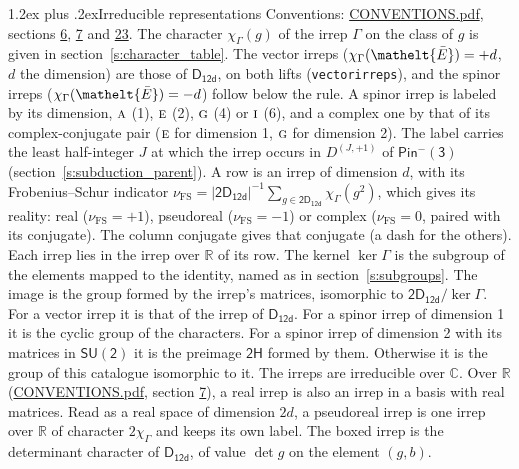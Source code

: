 \documentclass[10pt,a4paper]{article}
\makeatletter
\renewcommand\section{\@startsection{section}{1}{\z@}{-3ex plus -1ex minus -.2ex}%
  {1.2ex plus .2ex}{\normalfont\large\sffamily\bfseries\color{parttitle}}}
\numberwithin{equation}{section}
\newcommand{\eltfont}[1]{{\let\sigma\eltsigma\mathelt{#1}}}
\newcommand{\grp}[1]{\mathsf{#1}}
\newcommand{\irr}[1]{\text{\normalfont\scshape #1}}
\newcommand{\elt}[1]{\eltfont{#1}}
\newcommand{\irrJp}[2]{D^{(#1,#2)}}
\newcommand{\irchar}[1]{\chi_{#1}}
\newcommand{\fsind}{\nu_{\mathrm{FS}}}
\newcommand{\barred}[1]{\bar{#1}}
\makeatother
\begin{document}
\section{Irreducible representations}\label{s:irreps}
Conventions: \href{../../CONVENTIONS.pdf}{CONVENTIONS.pdf}, sections \href{../../../rotation/CONVENTIONS.pdf\#conv.6}{6}, \href{../../../rotation/CONVENTIONS.pdf\#conv.7}{7} and \href{../../CONVENTIONS.pdf\#conv.23}{23}.
\leavevmode\label{n:function.character}\label{n:irrep.Gamma}The character $\irchar{\Gamma}(g)$ of the irrep $\Gamma$ on the class of $g$ is given in section~\ref{s:character_table}. \label{n:index.dimension}The vector irreps ($\irchar{\Gamma}(\elt{\barred{E}}) = +d$, $d$ the dimension) are those of \href{../../../rotation/data/pdf/D12d.pdf}{$\grp{D_{12d}}$}, on both lifts (\texttt{vectorirreps}), and the spinor irreps ($\irchar{\Gamma}(\elt{\barred{E}}) = -d$) follow below the rule. A spinor irrep is labeled by its dimension, $\irr{a}$ (1), $\irr{e}$ (2), $\irr{g}$ (4) or $\irr{i}$ (6), and a complex one by that of its complex-conjugate pair ($\irr{e}$ for dimension 1, $\irr{g}$ for dimension 2). The label carries the least half-integer $J$ at which the irrep occurs in $\irrJp{J}{+1}$ of $\grp{Pin^{-}(3)}$ (section~\ref{s:subduction_parent}).
\leavevmode\label{n:index.frobenius}\label{n:head.irrep}\label{n:head.reality}A row is an irrep of dimension $d$, with its Frobenius--Schur indicator $\fsind = |\grp{2D_{12d}}|^{-1}\allowbreak\sum_{g\in\grp{2D_{12d}}}\irchar{\Gamma}(g^2)$, which gives its reality: real ($\fsind = +1$), pseudoreal ($\fsind = -1$) or complex ($\fsind = 0$, paired with its conjugate). \label{n:head.conjugate}The column conjugate gives that conjugate (a dash for the others). \label{n:head.over.real}Each irrep lies in the irrep over $\mathbb{R}$ of its row. \label{n:head.kernel}The kernel $\ker\Gamma$ is the subgroup of the elements mapped to the identity, named as in section~\ref{s:subgroups}. \label{n:head.image}The image is the group formed by the irrep's matrices, isomorphic to $\grp{2D_{12d}}/\ker\Gamma$. For a vector irrep it is that of the irrep of \href{../../../rotation/data/pdf/D12d.pdf}{$\grp{D_{12d}}$}. For a spinor irrep of dimension 1 it is the cyclic group of the characters. For a spinor irrep of dimension 2 with its matrices in $\grp{SU(2)}$ it is the preimage $\grp{2H}$ formed by them. Otherwise it is the group of this catalogue isomorphic to it. The irreps are irreducible over $\mathbb{C}$. Over $\mathbb{R}$ (\href{../../CONVENTIONS.pdf}{CONVENTIONS.pdf}, section \href{../../../rotation/CONVENTIONS.pdf\#conv.7}{7}), a real irrep is also an irrep in a basis with real matrices. Read as a real space of dimension $2d$, a pseudoreal irrep is one irrep over $\mathbb{R}$ of character $2\irchar{\Gamma}$ and keeps its own label. \label{n:mark.determinant}The boxed irrep is the determinant character of \href{../../../rotation/data/pdf/D12d.pdf}{$\grp{D_{12d}}$}, of value $\det g$ on the element $(g, b)$.
\end{document}
